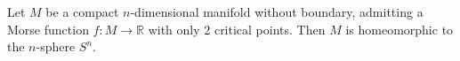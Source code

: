 Let $M$ be a compact $n$-dimensional manifold without boundary, admitting a Morse function $f: M \to \mathbb{R}$ with only 2 critical points. Then $M$ is homeomorphic to the $n$-sphere $S^n$.
